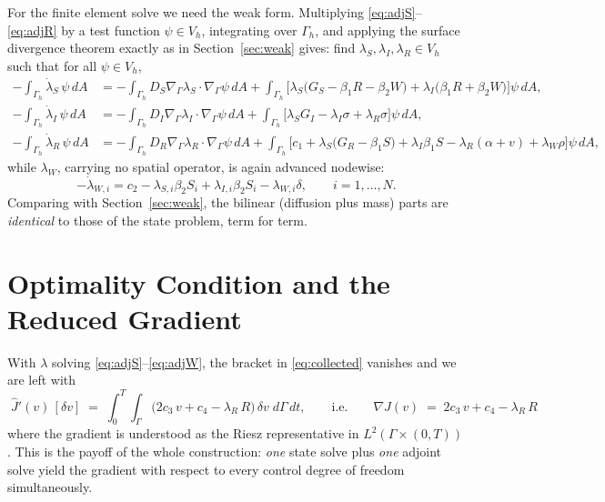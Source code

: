 \documentclass[11pt]{article}
\newcommand{\Grad}{\nabla_\Gamma}
\begin{document}
For the finite element solve we need the weak form. Multiplying \eqref{eq:adjS}--\eqref{eq:adjR} by a test function $\psi\in V_h$, integrating over $\Gamma_h$, and applying the surface divergence theorem exactly as in Section~\ref{sec:weak} gives: find $\lambda_S,\lambda_I,\lambda_R \in V_h$ such that for all $\psi\in V_h$,
\begin{align}
-\int_{\Gamma_h}\dot\lambda_S\,\psi\,dA &= -\int_{\Gamma_h} D_S\Grad\lambda_S\cdot\Grad\psi\,dA + \int_{\Gamma_h}\Big[\lambda_S\big(G_S - \beta_1 R - \beta_2 W\big) + \lambda_I\big(\beta_1 R + \beta_2 W\big)\Big]\psi\,dA,\\
-\int_{\Gamma_h}\dot\lambda_I\,\psi\,dA &= -\int_{\Gamma_h} D_I\Grad\lambda_I\cdot\Grad\psi\,dA + \int_{\Gamma_h}\Big[\lambda_S G_I - \lambda_I\sigma + \lambda_R\sigma\Big]\psi\,dA,\\
-\int_{\Gamma_h}\dot\lambda_R\,\psi\,dA &= -\int_{\Gamma_h} D_R\Grad\lambda_R\cdot\Grad\psi\,dA + \int_{\Gamma_h}\Big[c_1 + \lambda_S\big(G_R-\beta_1 S\big) + \lambda_I\beta_1 S - \lambda_R(\alpha+v) + \lambda_W\rho\Big]\psi\,dA,
\end{align}
while $\lambda_W$, carrying no spatial operator, is again advanced nodewise:
\begin{equation}
-\dot\lambda_{W,i} = c_2 - \lambda_{S,i}\beta_2 S_i + \lambda_{I,i}\beta_2 S_i - \lambda_{W,i}\delta, \qquad i=1,\dots,N.
\end{equation}
Comparing with Section~\ref{sec:weak}, the bilinear (diffusion plus mass) parts are \emph{identical} to those of the state problem, term for term.

\section{Optimality Condition and the Reduced Gradient}
\label{sec:optimality}

With $\lambda$ solving \eqref{eq:adjS}--\eqref{eq:adjW}, the bracket in \eqref{eq:collected} vanishes and we are left with
\begin{equation}
\boxed{\;
\hat J'(v)\,[\delta v] \;=\; \int_0^T\!\!\int_\Gamma \Big(2c_3\,v + c_4 - \lambda_R\,R\Big)\,\delta v \;d\Gamma\,dt,
\qquad\text{i.e.}\qquad
\nabla \hat J(v) \;=\; 2c_3\,v + c_4 - \lambda_R\,R \;}
\label{eq:gradient}
\end{equation}
where the gradient is understood as the Riesz representative in $L^2(\Gamma\times(0,T))$. This is the payoff of the whole construction: \emph{one} state solve plus \emph{one} adjoint solve yield the gradient with respect to every control degree of freedom simultaneously.
\end{document}
